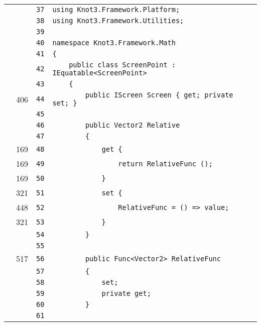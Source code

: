 \documentclass[a4paper,10pt]{article}
\begin{document}
\begin{longtable}[l]{lrrl}
\cellcolor{gray} &  & \verb~37~ & \verb~using Knot3.Framework.Platform;~\\
\cellcolor{gray} &  & \verb~38~ & \verb~using Knot3.Framework.Utilities;~\\
\cellcolor{gray} &  & \verb~39~ & \verb~~\\
\cellcolor{gray} &  & \verb~40~ & \verb~namespace Knot3.Framework.Math~\\
\cellcolor{gray} &  & \verb~41~ & \verb~{~\\
\cellcolor{gray} &  & \verb~42~ & \verb~    public class ScreenPoint : IEquatable<ScreenPoint>~\\
\cellcolor{gray} &  & \verb~43~ & \verb~    {~\\
\cellcolor{green} & 406 & \verb~44~ & \verb~        public IScreen Screen { get; private set; }~\\
\cellcolor{gray} &  & \verb~45~ & \verb~~\\
\cellcolor{gray} &  & \verb~46~ & \verb~        public Vector2 Relative~\\
\cellcolor{gray} &  & \verb~47~ & \verb~        {~\\
\cellcolor{green} & 169 & \verb~48~ & \verb~            get {~\\
\cellcolor{green} & 169 & \verb~49~ & \verb~                return RelativeFunc ();~\\
\cellcolor{green} & 169 & \verb~50~ & \verb~            }~\\
\cellcolor{green} & 321 & \verb~51~ & \verb~            set {~\\
\cellcolor{green} & 448 & \verb~52~ & \verb~                RelativeFunc = () => value;~\\
\cellcolor{green} & 321 & \verb~53~ & \verb~            }~\\
\cellcolor{gray} &  & \verb~54~ & \verb~        }~\\
\cellcolor{gray} &  & \verb~55~ & \verb~~\\
\cellcolor{green} & 517 & \verb~56~ & \verb~        public Func<Vector2> RelativeFunc~\\
\cellcolor{gray} &  & \verb~57~ & \verb~        {~\\
\cellcolor{gray} &  & \verb~58~ & \verb~            set;~\\
\cellcolor{gray} &  & \verb~59~ & \verb~            private get;~\\
\cellcolor{gray} &  & \verb~60~ & \verb~        }~\\
\cellcolor{gray} &  & \verb~61~ & \verb~~\\

\end{longtable}
\end{document}
